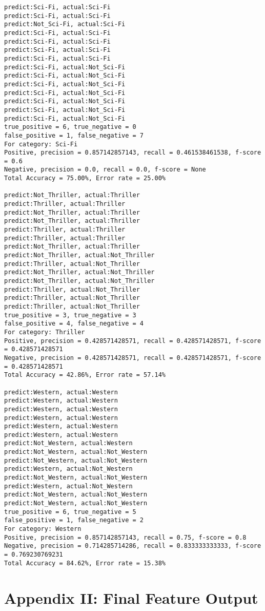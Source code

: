 \documentclass{article}
\begin{document}
\begin{lstlisting}
predict:Sci-Fi, actual:Sci-Fi
predict:Sci-Fi, actual:Sci-Fi
predict:Not_Sci-Fi, actual:Sci-Fi
predict:Sci-Fi, actual:Sci-Fi
predict:Sci-Fi, actual:Sci-Fi
predict:Sci-Fi, actual:Sci-Fi
predict:Sci-Fi, actual:Sci-Fi
predict:Sci-Fi, actual:Not_Sci-Fi
predict:Sci-Fi, actual:Not_Sci-Fi
predict:Sci-Fi, actual:Not_Sci-Fi
predict:Sci-Fi, actual:Not_Sci-Fi
predict:Sci-Fi, actual:Not_Sci-Fi
predict:Sci-Fi, actual:Not_Sci-Fi
predict:Sci-Fi, actual:Not_Sci-Fi
true_positive = 6, true_negative = 0
false_positive = 1, false_negative = 7
For category: Sci-Fi
Positive, precision = 0.857142857143, recall = 0.461538461538, f-score = 0.6 
Negative, precision = 0.0, recall = 0.0, f-score = None 
Total Accuracy = 75.00%, Error rate = 25.00%

predict:Not_Thriller, actual:Thriller
predict:Thriller, actual:Thriller
predict:Not_Thriller, actual:Thriller
predict:Not_Thriller, actual:Thriller
predict:Thriller, actual:Thriller
predict:Thriller, actual:Thriller
predict:Not_Thriller, actual:Thriller
predict:Not_Thriller, actual:Not_Thriller
predict:Thriller, actual:Not_Thriller
predict:Not_Thriller, actual:Not_Thriller
predict:Not_Thriller, actual:Not_Thriller
predict:Thriller, actual:Not_Thriller
predict:Thriller, actual:Not_Thriller
predict:Thriller, actual:Not_Thriller
true_positive = 3, true_negative = 3
false_positive = 4, false_negative = 4
For category: Thriller
Positive, precision = 0.428571428571, recall = 0.428571428571, f-score = 0.428571428571 
Negative, precision = 0.428571428571, recall = 0.428571428571, f-score = 0.428571428571 
Total Accuracy = 42.86%, Error rate = 57.14%

predict:Western, actual:Western
predict:Western, actual:Western
predict:Western, actual:Western
predict:Western, actual:Western
predict:Western, actual:Western
predict:Western, actual:Western
predict:Not_Western, actual:Western
predict:Not_Western, actual:Not_Western
predict:Not_Western, actual:Not_Western
predict:Western, actual:Not_Western
predict:Not_Western, actual:Not_Western
predict:Western, actual:Not_Western
predict:Not_Western, actual:Not_Western
predict:Not_Western, actual:Not_Western
true_positive = 6, true_negative = 5
false_positive = 1, false_negative = 2
For category: Western
Positive, precision = 0.857142857143, recall = 0.75, f-score = 0.8 
Negative, precision = 0.714285714286, recall = 0.833333333333, f-score = 0.769230769231 
Total Accuracy = 84.62%, Error rate = 15.38%
\end{lstlisting}

\section{Appendix II: Final Feature Output}
\end{document}
